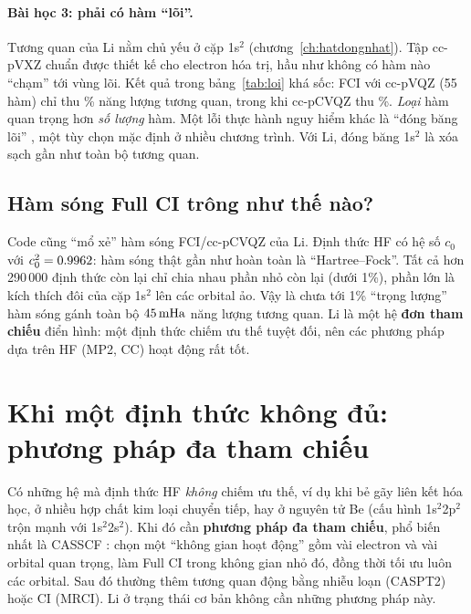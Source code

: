 \paragraph{Bài học 3: phải có hàm ``lõi''.} Tương quan của Li nằm chủ yếu ở cặp 1s$^2$ (chương~\ref{ch:hatdongnhat}). Tập cc-pVXZ chuẩn được thiết kế cho electron hóa trị, hầu như không có hàm nào ``chạm'' tới vùng lõi. Kết quả trong bảng~\ref{tab:loi} khá sốc: FCI với cc-pVQZ (55 hàm) chỉ thu \PctCorePVQZ\% năng lượng tương quan, trong khi cc-pCVQZ thu \PctCoreCVQZ\%. \emph{Loại} hàm quan trọng hơn \emph{số lượng} hàm. Một lỗi thực hành nguy hiểm khác là ``đóng băng lõi'' , một tùy chọn mặc định ở nhiều chương trình. Với Li, đóng băng 1s$^2$ là xóa sạch gần như toàn bộ tương quan.



\subsection{Hàm sóng Full CI trông như thế nào?}
Code cũng ``mổ xẻ'' hàm sóng FCI/cc-pCVQZ của Li. Định thức HF có hệ số $c_0$ với $c_0^2=0.9962$: hàm sóng thật gần như hoàn toàn là ``Hartree--Fock''. Tất cả hơn 290\,000 định thức còn lại chỉ chia nhau phần nhỏ còn lại (dưới 1\%), phần lớn là kích thích đôi của cặp 1s$^2$ lên các orbital ảo. Vậy là chưa tới 1\% ``trọng lượng'' hàm sóng gánh toàn bộ $45\,\mathrm{mHa}$ năng lượng tương quan. Li là một hệ \textbf{đơn tham chiếu}  điển hình: một định thức chiếm ưu thế tuyệt đối, nên các phương pháp dựa trên HF (MP2, CC) hoạt động rất tốt.

\section{Khi một định thức không đủ: phương pháp đa tham chiếu}
Có những hệ mà định thức HF \emph{không} chiếm ưu thế, ví dụ khi bẻ gãy liên kết hóa học, ở nhiều hợp chất kim loại chuyển tiếp, hay ở nguyên tử Be (cấu hình 1s$^2$2p$^2$ trộn mạnh với 1s$^2$2s$^2$). Khi đó cần \textbf{phương pháp đa tham chiếu}, phổ biến nhất là CASSCF \cite{Roos1980}: chọn một ``không gian hoạt động'' gồm vài electron và vài orbital quan trọng, làm Full CI trong không gian nhỏ đó, đồng thời tối ưu luôn các orbital. Sau đó thường thêm tương quan động bằng nhiễu loạn (CASPT2) hoặc CI (MRCI). Li ở trạng thái cơ bản không cần những phương pháp này.


